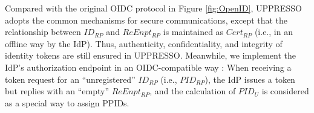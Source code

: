 %

Compared with the original OIDC protocol in Figure \ref{fig:OpenID},
UPPRESSO adopts the common mechanisms for secure communications,
except that the relationship between $ID_{RP}$ and $ReEnpt_{RP}$ is maintained as $Cert_{RP}$ (i.e., in an offline way by the IdP).
Thus, authenticity, confidentiality, and integrity of identity tokens are still ensured in UPPRESSO.
Meanwhile, we implement the IdP's authorization endpoint in an OIDC-compatible way \cite{rfc6749,OpenIDConnect}:
        When receiving a token request for an ``unregistered'' $ID_{RP}$ (i.e., $PID_{RP}$),
the IdP issues a token but replies with an ``empty'' $ReEnpt_{RP}$,
    and the calculation of $PID_{U}$ is considered as a special way to assign PPIDs.

